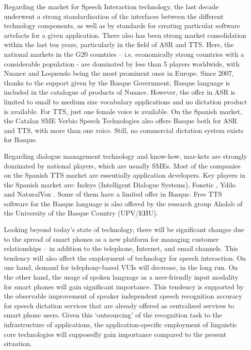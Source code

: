 \begin{multicols}{2}
Regarding the market for Speech Interaction technology, the last decade underwent a strong standardisation of the interfaces between the different technology components, as well as by standards for creating particular software artefacts for a given application. There also has been strong market consolidation within the last ten years, particularly in the field of ASR and TTS. Here, the national markets in the G20 countries – i.e. economically strong countries with a considerable population - are dominated by less than 5 players worldwide, with Nuance and Loquendo being the most prominent ones in Europe. Since 2007, thanks to the support given by the Basque Government, Basque language is included in the catalogue of products of Nuance. However, the offer in ASR is limited to small to medium size vocabulary applications and no dictation product is available. For TTS, just one female voice is available. On the Spanish market, the Catalan SME Verbio Speech Technologies \cite{BAS-Nota29}  also offers Basque both for ASR and TTS, with more than one voice.  Still, no commercial dictation system exists for Basque. 

Regarding dialogue management technology and know-how, mar-kets are strongly dominated by national players, which are usually SMEs. Most of the companies on the Spanish TTS market are essentially application developers. Key players in the Spanish market are: Indsys \cite{BAS-Nota30}  (Intelligent Dialogue Systems), Fonetic \cite{BAS-Nota31}, Ydilo \cite{BAS-Nota32}  and NaturalVox \cite{BAS-Nota33}. Some of them have a limited offer in Basque. Free TTS software for the Basque language is also offered by the research group Aholab \cite{BAS-Nota34} of the University of the Basque Country (UPV/EHU).

Looking beyond today’s state of technology, there will be significant changes due to the spread of smart phones as a new platform for managing customer relationships – in addition to the telephone, Internet, and email channels. This tendency will also affect the employment of technology for speech interaction. On one hand, demand for telephony-based VUIs will decrease, in the long run. On the other hand, the usage of spoken language as a user-friendly input modality for smart phones will gain significant importance. This tendency is supported by the observable improvement of speaker independent speech recognition accuracy for speech dictation services that are already offered as centralised services to smart phone users. Given this ‘outsourcing’ of the recognition task to the infrastructure of applications, the application-specific employment of linguistic core technologies will supposedly gain importance compared to the present situation. 


\end{multicols}
